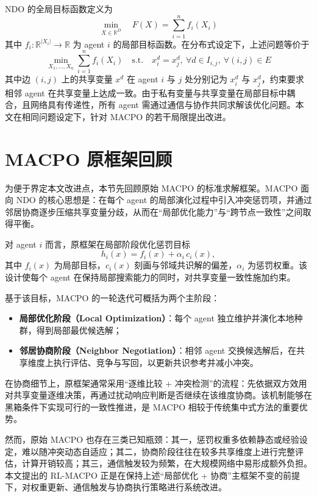 \documentclass[conference]{IEEEtran}
\begin{document}
NDO 的全局目标函数定义为
\[
\min_{X \in \mathbb{R}^D} \quad F(X) = \sum_{i=1}^{n} f_i(X_i)
\]
其中 \(f_i : \mathbb{R}^{|X_i|} \to \mathbb{R}\) 为 agent \(i\) 的局部目标函数。在分布式设定下，上述问题等价于
\[
\min_{X_1, \ldots, X_n} \sum_{i=1}^{n} f_i(X_i) \quad \text{s.t.} \quad x_i^d = x_j^d,\ \forall d \in I_{i,j},\ \forall (i,j) \in E
\]
其中边 \((i,j)\) 上的共享变量 \(x^d\) 在 agent \(i\) 与 \(j\) 处分别记为 \(x_i^d\) 与 \(x_j^d\)，约束要求相邻 agent 在共享变量上达成一致。由于私有变量与共享变量在局部目标中耦合，且网络具有传递性，所有 agent 需通过通信与协作共同求解该优化问题。本文在相同问题设定下，针对 MACPO 的若干局限提出改进。

\section{MACPO 原框架回顾}\label{sec:macpo_prelim}

为便于界定本文改进点，本节先回顾原始 MACPO 的标准求解框架。MACPO 面向 NDO 的核心思想是：在每个 agent 的局部演化过程中引入冲突惩罚项，并通过邻居协商逐步压缩共享变量分歧，从而在“局部优化能力”与“跨节点一致性”之间取得平衡。

对 agent \(i\) 而言，原框架在局部阶段优化惩罚目标
\[
h_i(x)=f_i(x)+\alpha_i\,c_i(x),
\]
其中 \(f_i(x)\) 为局部目标，\(c_i(x)\) 刻画与邻域共识解的偏差，\(\alpha_i\) 为惩罚权重。该设计使每个 agent 在保持局部搜索能力的同时，对共享变量一致性施加约束。

基于该目标，MACPO 的一轮迭代可概括为两个主阶段：
\begin{itemize}
\item \textbf{局部优化阶段（Local Optimization）}：每个 agent 独立维护并演化本地种群，得到局部最优候选解；
\item \textbf{邻居协商阶段（Neighbor Negotiation）}：相邻 agent 交换候选解后，在共享维度上执行评估、竞争与写回，以更新共识参考并减小冲突。
\end{itemize}

在协商细节上，原框架通常采用“逐维比较 + 冲突检测”的流程：先依据双方效用对共享变量逐维决策，再通过扰动响应判断是否继续在该维度协商。该机制能够在黑箱条件下实现可行的一致性推进，是 MACPO 相较于传统集中式方法的重要优势。


然而，原始 MACPO 也存在三类已知瓶颈：其一，惩罚权重多依赖静态或经验设定，难以随冲突动态自适应；其二，协商阶段往往在较多共享维度上进行完整评估，计算开销较高；其三，通信触发较为频繁，在大规模网络中易形成额外负担。本文提出的 RL-MACPO 正是在保持上述“局部优化 + 协商”主框架不变的前提下，对权重更新、通信触发与协商执行策略进行系统改进。
\end{document}
